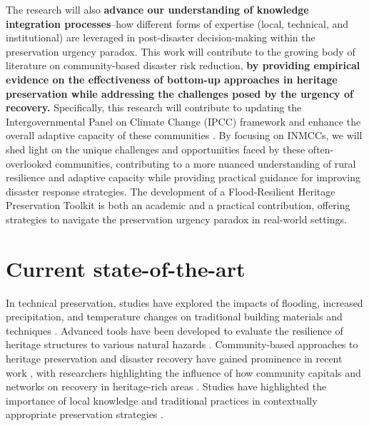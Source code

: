 \documentclass[11pt]{article}
\begin{document}
The research will also \textbf{advance our understanding of knowledge integration processes}--how different forms of expertise (local, technical, and institutional) are leveraged in post-disaster decision-making within the preservation urgency paradox. 
This work will contribute to the growing body of literature on community-based disaster risk reduction, \textbf{by providing empirical evidence on the effectiveness of bottom-up approaches in heritage preservation while addressing the challenges posed by the urgency of recovery.}
Specifically, this research will contribute to updating the Intergovernmental Panel on Climate Change (IPCC) framework and enhance the overall adaptive capacity of these communities \cite{kundzewicz2004floods}. 
By focusing on INMCCs, we will shed light on the unique challenges and opportunities faced by these often-overlooked communities, contributing to a more nuanced understanding of rural resilience and adaptive capacity while providing practical guidance for improving disaster response strategies. 
The development of a Flood-Resilient Heritage Preservation Toolkit is both an academic and a practical contribution, offering strategies to navigate the preservation urgency paradox in real-world settings.

\vspace{-10pt}
\section{Current state-of-the-art}

In technical preservation, studies have explored the impacts of flooding, increased precipitation, and temperature changes on traditional building materials and techniques \cite{sesana2021climate, NPS2021, Arrighi2024, HUDExchange2024}. 
Advanced tools have been developed to evaluate the resilience of heritage structures to various natural hazards \cite{briz2022prioritization}.
Community-based approaches to heritage preservation and disaster recovery have gained prominence in recent work \cite{castro2021community, ali2021integrating}, with researchers highlighting the influence of how community capitals and networks on recovery in heritage-rich areas \cite{gibson2019engagement}. 
Studies have highlighted the importance of local knowledge and traditional practices in contextually appropriate preservation strategies \cite{wheeler2020informing}.
\end{document}
